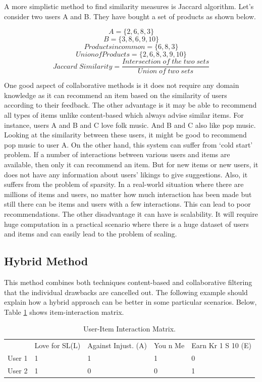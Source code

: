 \documentclass{jot}
\begin{document}
A more simplistic method to find similarity measures is Jaccard algorithm. Let’s consider two users A and B. They have bought a set of products as shown below.

\[A = \{2,6,8,3\}\]
\[B = \{3,8,6,9,10\}\]
\[Products in common = \{6,8,3\}\]
\[Union of Products = \{2,6,8,3,9,10\}\]
\[Jaccard\;Similarity = \frac{Intersection\;of\;the\;two\;sets}{Union\;of\;two\;sets}\]

One good aspect of collaborative methods is it does not require any domain knowledge as it can recommend an item based on the similarity of users according to their feedback. The other advantage is it may be able to recommend all types of items unlike content-based which always advise similar items. For instance, users A and B and C love folk music. And B and C also like pop music. Looking at the similarity between these users, it might be good to recommend pop music to user A. On the other hand, this system can suffer from ‘cold start’ problem. If a number of interactions between various users and items are available, then only it can recommend an item. But for new items or new users, it does not have any information about users’ likings to give suggestions. Also, it suffers from the problem of sparsity. In a real-world situation where there are millions of items and users, no matter how much interaction has been made but still there can be items and users with a few interactions. This can lead to poor recommendations. The other disadvantage it can have is scalability. It will require huge computation in a practical scenario where there is a huge dataset of users and items and can easily lead to the problem of scaling.

\subsection{Hybrid Method}
This method combines both techniques content-based and collaborative filtering that the individual drawbacks are cancelled out. The following example should explain how a hybrid approach can be better in some particular scenarios. Below, Table  \ref{tab:hybrid} shows item-interaction matrix.

\begin{table}[h!]
\centering
\begin{tabular}{lllll}
 & Love for SL(L) & Against Injust. (A) & You n Me & Earn Kr 1 S 10 (E) \\
User 1     & 1       & 1       & 1         & 0      \\
User 2     & 1       & 0       & 0         & 1      \\
\end{tabular}
\caption{User-Item Interaction Matrix.}
\label{tab:hybrid}
\end{table}
\end{document}
